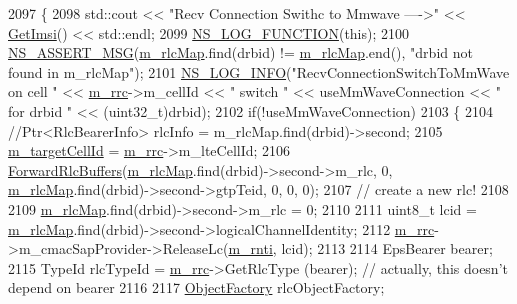 \begin{DoxyCode}
2097 \{
2098   std::cout << \textcolor{stringliteral}{"Recv Connection Swithc to Mmwave ---->"} << \hyperlink{classns3_1_1UeManager_a9609913bb407b13da17a55d9013e8e10}{GetImsi}() << std::endl;
2099         \hyperlink{log-macros-disabled_8h_a90b90d5bad1f39cb1b64923ea94c0761}{NS\_LOG\_FUNCTION}(\textcolor{keyword}{this});
2100         \hyperlink{assert_8h_aff5ece9066c74e681e74999856f08539}{NS\_ASSERT\_MSG}(\hyperlink{classns3_1_1UeManager_a64f37a901db7a322552ba08d87e65770}{m\_rlcMap}.find(drbid) != \hyperlink{classns3_1_1UeManager_a64f37a901db7a322552ba08d87e65770}{m\_rlcMap}.end(), \textcolor{stringliteral}{"drbid not found
       in m\_rlcMap"});
2101   \hyperlink{group__logging_gafbd73ee2cf9f26b319f49086d8e860fb}{NS\_LOG\_INFO}(\textcolor{stringliteral}{"RecvConnectionSwitchToMmWave on cell "} << \hyperlink{classns3_1_1UeManager_ab4405e9f354c66e7c1a4c95832290f5b}{m\_rrc}->m\_cellId << \textcolor{stringliteral}{" switch "} << 
      useMmWaveConnection << \textcolor{stringliteral}{" for drbid "} << (uint32\_t)drbid);
2102   \textcolor{keywordflow}{if}(!useMmWaveConnection)
2103   \{
2104     \textcolor{comment}{//Ptr<RlcBearerInfo> rlcInfo = m\_rlcMap.find(drbid)->second;}
2105     \hyperlink{classns3_1_1UeManager_a8a70641b8dfb0641e6cfcf4cc83083a3}{m\_targetCellId} = \hyperlink{classns3_1_1UeManager_ab4405e9f354c66e7c1a4c95832290f5b}{m\_rrc}->m\_lteCellId;
2106     \hyperlink{classns3_1_1UeManager_acfe070a93481248c1d2624f02a448a34}{ForwardRlcBuffers}(\hyperlink{classns3_1_1UeManager_a64f37a901db7a322552ba08d87e65770}{m\_rlcMap}.find(drbid)->second->m\_rlc, 0, 
      \hyperlink{classns3_1_1UeManager_a64f37a901db7a322552ba08d87e65770}{m\_rlcMap}.find(drbid)->second->gtpTeid, 0, 0, 0);
2107     \textcolor{comment}{// create a new rlc!}
2108 
2109     \hyperlink{classns3_1_1UeManager_a64f37a901db7a322552ba08d87e65770}{m\_rlcMap}.find(drbid)->second->m\_rlc = 0;
2110 
2111     uint8\_t lcid = \hyperlink{classns3_1_1UeManager_a64f37a901db7a322552ba08d87e65770}{m\_rlcMap}.find(drbid)->second->logicalChannelIdentity;
2112     \hyperlink{classns3_1_1UeManager_ab4405e9f354c66e7c1a4c95832290f5b}{m\_rrc}->m\_cmacSapProvider->ReleaseLc(\hyperlink{classns3_1_1UeManager_a5a72b4fe818f21993bd7f05d7e2c4f83}{m\_rnti}, lcid);
2113 
2114     EpsBearer bearer;
2115     TypeId rlcTypeId = \hyperlink{classns3_1_1UeManager_ab4405e9f354c66e7c1a4c95832290f5b}{m\_rrc}->GetRlcType (bearer); \textcolor{comment}{// actually, this doesn't depend on bearer}
2116 
2117     \hyperlink{classns3_1_1Object_a2810e70b8c8377aa8617138fc0f65e92}{ObjectFactory} rlcObjectFactory;

\end{DoxyCode}
